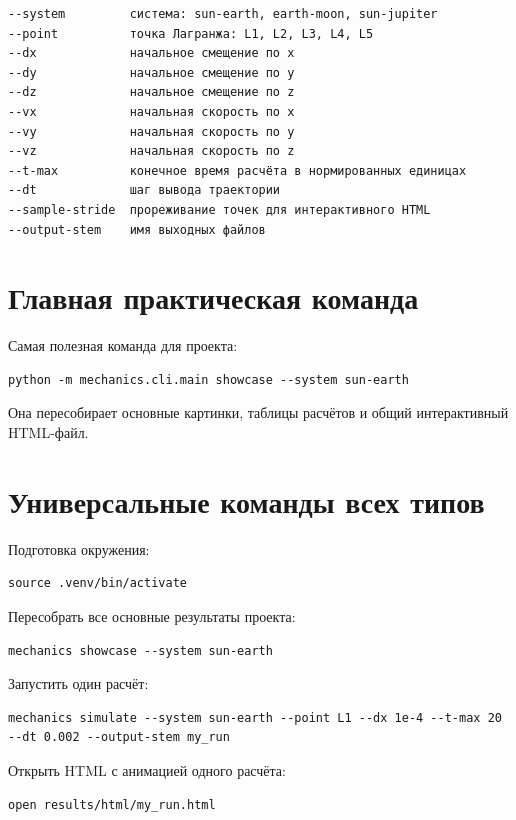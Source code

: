 \documentclass[a4paper,12pt]{article}
\begin{document}
\begin{lstlisting}
--system         система: sun-earth, earth-moon, sun-jupiter
--point          точка Лагранжа: L1, L2, L3, L4, L5
--dx             начальное смещение по x
--dy             начальное смещение по y
--dz             начальное смещение по z
--vx             начальная скорость по x
--vy             начальная скорость по y
--vz             начальная скорость по z
--t-max          конечное время расчёта в нормированных единицах
--dt             шаг вывода траектории
--sample-stride  прореживание точек для интерактивного HTML
--output-stem    имя выходных файлов
\end{lstlisting}

\section*{Главная практическая команда}

Самая полезная команда для проекта:

\begin{lstlisting}
python -m mechanics.cli.main showcase --system sun-earth
\end{lstlisting}

Она пересобирает основные картинки, таблицы расчётов и общий интерактивный
HTML-файл.

\section*{Универсальные команды всех типов}

Подготовка окружения:

\begin{lstlisting}
source .venv/bin/activate
\end{lstlisting}

Пересобрать все основные результаты проекта:

\begin{lstlisting}
mechanics showcase --system sun-earth
\end{lstlisting}

Запустить один расчёт:

\begin{lstlisting}
mechanics simulate --system sun-earth --point L1 --dx 1e-4 --t-max 20 --dt 0.002 --output-stem my_run
\end{lstlisting}

Открыть HTML с анимацией одного расчёта:

\begin{lstlisting}
open results/html/my_run.html
\end{lstlisting}
\end{document}
